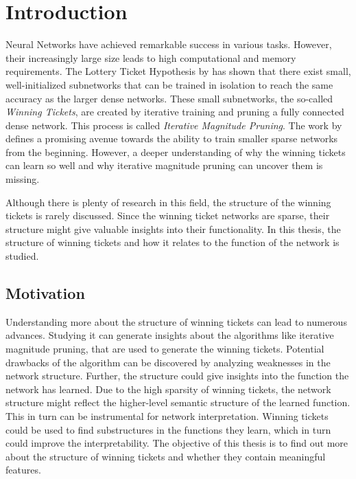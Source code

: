 \chapter{Introduction}

Neural Networks have achieved remarkable success in various tasks.
However, their increasingly large size leads to high computational and memory requirements.
The Lottery Ticket Hypothesis by \textcite{LTH} has shown that there exist small, well-initialized subnetworks that can be trained in isolation to reach the same accuracy as the larger dense networks.
These small subnetworks, the so-called \textit{Winning Tickets}, are created by iterative training and pruning a fully connected dense network.
This process is called \textit{Iterative Magnitude Pruning}.
The work by \textcite{LTH} defines a promising avenue towards the ability to train smaller sparse networks from the beginning.
However, a deeper understanding of why the winning tickets can learn so well and why iterative magnitude pruning can uncover them is missing.

Although there is plenty of research in this field, the structure of the winning tickets is rarely discussed.
Since the winning ticket networks are sparse, their structure might give valuable insights into their functionality.
In this thesis, the structure of winning tickets and how it relates to the function of the network is studied.

\section{Motivation}
Understanding more about the structure of winning tickets can lead to numerous advances.
Studying it can generate insights about the algorithms like iterative magnitude pruning, that are used to generate the winning tickets.
Potential drawbacks of the algorithm can be discovered by analyzing weaknesses in the network structure.
Further, the structure could give insights into the function the network has learned.
Due to the high sparsity of winning tickets, the network structure might reflect the higher-level semantic structure of the learned function.
This in turn can be instrumental for network interpretation.
Winning tickets could be used to find substructures in the functions they learn, which in turn could improve the interpretability.
The objective of this thesis is to find out more about the structure of winning tickets and whether they contain meaningful features.


